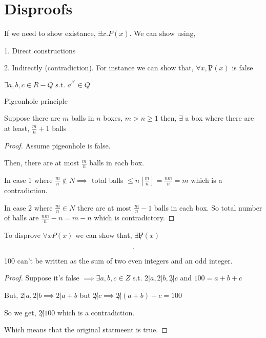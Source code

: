 \section*{Disproofs}


If we need to show existance, $\exists x. P(x)$. We can show using, 

1. Direct constructions

2. Indirectly (contradiction). For instance we can show that, $\forall x, \not P(x)$ is false


\begin{eg}
    $\exists a,b,c \in R - Q \text{ s.t. } a^b^c \in Q$
\end{eg}

\begin{eg}
    Pigeonhole principle

    Suppose there are $m$ balls in $n$ boxes, $m > n \geq 1$ then, $\exists$ a box where there are at least, $\frac{m}{n} + 1$ balls 
\end{eg}

\begin{proof}
    Assume pigeonhole is false.

    Then, there are at most $\frac{m}{n}$ balls in each box.

    In case 1 where $\frac{m}{n} \not \in N \implies$  total balls $\leq n [\frac{m}{n}] = \frac{nm}{n} = m$ which is a contradiction.

    In case 2 where $\frac{m}{n}\in N$ there are at most $\frac{m}{n} - 1$ balls in each box.
    So total number of balls are $\frac{nm}{n} - n = m - n$ which is contradictory.
\end{proof}


To disprove $\forall x P(x)$ we can show that, $\exists \not P(x)$



\[

.\] 
\begin{eg}
    100 can't be written as the sum of two even integers and an odd integer.
\end{eg}
\begin{proof}
    Suppose it's false $\implies \exists a,b,c \in Z$ s.t. $2 | a, 2 | b, 2 \not | c$ and  $100 = a + b + c$

    But,  $2 | a, 2 | b \implies 2 | a + b$ but  $2 \not | c \implies 2 \not | (a + b) + c = 100$

    So we get,  $2 \not | 100$ which is a contradiction.

    Which means that the original statmeent is true.
\end{proof}



